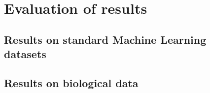 \chapter{Evaluation of results}

\lipsum[82]

\section{Results on standard Machine Learning datasets}

\lipsum[83]

\section{Results on biological data}

\lipsum[84]
